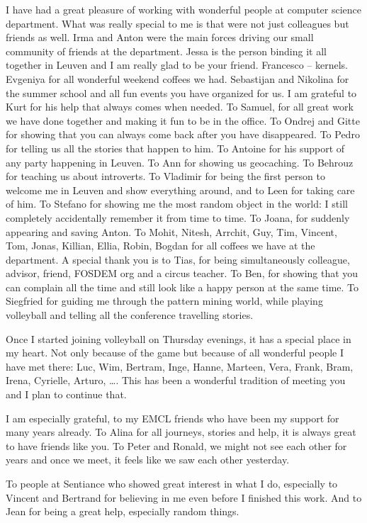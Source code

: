 I have had a great pleasure of working with wonderful people at computer science department. What was really special to me is that were not just colleagues but friends as well. Irma and Anton were the main forces driving our small community of friends at the department. Jessa is the person binding it all together in Leuven and I am really glad to be your friend. Francesco -- kernels. Evgeniya for all wonderful weekend coffees we had. Sebastijan and Nikolina for the summer school and all fun events you have organized for us. I am grateful to Kurt for his help that always comes when needed. To Samuel, for all great work we have done together and making it fun to be in the office. To Ondrej and Gitte for showing that you can always come back after you have disappeared. To Pedro for telling us all the stories that happen to him. To Antoine for his support of any party happening in Leuven. To Ann for showing us geocaching. To Behrouz for teaching us about introverts. To Vladimir for being the first person to welcome me in Leuven and show everything around, and to Leen for taking care of him. To Stefano for showing me the most random object in the world: I still completely accidentally remember it from time to time. To Joana, for suddenly appearing and saving Anton. To Mohit, Nitesh, Arrchit, Guy, Tim, Vincent, Tom, Jonas, Killian, Ellia, Robin, Bogdan for all coffees we have at the department. A special thank you is to Tias, for being simultaneously colleague, advisor, friend, FOSDEM org and a circus teacher. To Ben, for showing that you can complain all the time and still look like a happy person at the same time. To Siegfried for guiding me through the pattern mining world, while playing volleyball and telling all the conference travelling stories.

Once I started joining volleyball on Thursday evenings, it has a special place in my heart. Not only because of the game but because of all wonderful people I have met there: Luc, Wim, Bertram, Inge, Hanne, Marteen, Vera, Frank, Bram, Irena, Cyrielle, Arturo, \dots . This has been a wonderful tradition of meeting you and I plan to continue that. 

I am especially grateful, to my EMCL friends who have been my support for many years already. To Alina for all journeys, stories and help, it is always great to have friends like you. To Peter and Ronald, we might not see each other for years and once we meet, it feels like we saw each other yesterday. 

To people at Sentiance who showed great interest in what I do, especially to Vincent and Bertrand for believing in me even before I finished this work. And to Jean for being a great help, especially random things.

